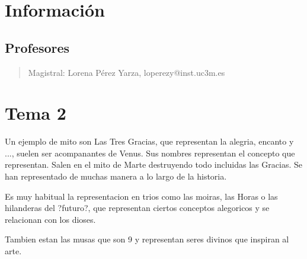 \documentclass[12pt, twoside, openright]{report} %
\begin{document}
\tableofcontents
\thispagestyle{fancy}

\listoffigures
\thispagestyle{fancy}

\listoftables
\thispagestyle{fancy}




\chapter{Información}\label{ch:informacion}
\section{Profesores}\label{sec:profesores}
\begin{quote}
	Magistral: Lorena Pérez Yarza, loperezy@inst.uc3m.es
\end{quote}





\chapter{Tema 2}

Un ejemplo de mito son Las Tres Gracias, que representan la alegria, encanto y ..., suelen ser acompanantes de Venus. Sus nombres representan el concepto que representan. Salen en el mito de Marte destruyendo todo incluidas las Gracias. Se han representado de muchas manera a lo largo de la historia.

Es muy habitual la representacion en trios como las moiras, las Horas o las hilanderas del ?futuro?, que representan ciertos conceptos alegoricos y se relacionan con los dioses.

Tambien estan las musas que son 9 y representan seres divinos que inspiran al arte.
\end{document}
